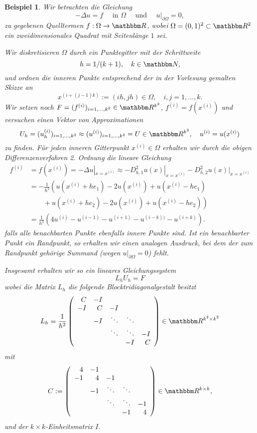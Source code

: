 \documentclass[12pt,a4paper]{book}
\theoremstyle{break}
\newtheorem{beispiel}[theorem]{Beispiel}
\theoremstyle{nonumberplain}
\newcommand{\N}{\mathbbm N}
\newcommand{\R}{\mathbbm R}
\newcommand{\1}{\mathbbm{1}} 			      	%
\begin{document}
\begin{beispiel}\label{bsp:poisson}
Wir betrachten die Gleichung
\[
-\Delta u=f \quad \mbox{ in $\Omega$} \quad \mbox{ und } \quad u|_{\partial \Omega}=0,
\]
zu gegebenen Quelltermen $f:\Omega \to \R$, wobei $\Omega=(0,1)^2\subset \R^2$ ein zweidimensionales Quadrat mit Seitenlänge $1$ sei.

Wir diskretisieren $\Omega$ durch ein Punktegitter mit der Schrittweite 
 \[
h=1/(k+1),\quad k\in \N,
\]
und ordnen 
die inneren Punkte entsprechend der in der Vorlesung gemalten Skizze an
\[
x^{(i+(j-1)k)}:=(ih,jh)\in \Omega, \quad i,j=1,\ldots,k.
\]
Wir setzen noch $F=(f^{(i)})_{i=1,\ldots,k^2}\in \R^{k^2}$, $f^{(i)}=f(x^{(i)})$ und versuchen einen
Vektor von Approximationen 
\[
U_h=(u_h^{(i)})_{i=1,\ldots,k^2}\approx (u^{(i)})_{i=1,\ldots,k^2}=U \in \R^{k^2}, \quad u^{(i)}=u(x^{(i)})
\]
zu finden. Für jeden inneren Gitterpunkt $x^{(i)}\in \Omega$ erhalten wir durch die obigen Differenzenverfahren 2. Ordnung
die lineare Gleichung
\begin{align*}
f^{(i)}&=f(x^{(i)})=- \Delta u|_{x=x^{(i)}}\approx - D_{h,1}^2 u(x)|_{x=x^{(i)}} - D_{h,2}^2 u(x)|_{x=x^{(i)}}\\
&= -\frac{1}{h^2}\left( u(x^{(i)} + he_1)-2u(x^{(i)})+u(x^{(i)}-he_1) \right.\\
& \qquad \left. {} + u(x^{(i)} + he_2)-2u(x^{(i)})+u(x^{(i)}-he_2)\right)\\
&= \frac{1}{h^2} \left( 4 u^{(i)} - u^{(i-1)} - u^{(i+1)} -  u^{(i-k))} - u^{(i+k)} \right).
\end{align*}
falls alle benachbarten Punkte ebenfalls innere Punkte sind. Ist ein benachbarter Punkt ein Randpunkt, so erhalten
wir einen analogen Ausdruck, bei dem der zum Randpunkt gehörige Summand (wegen $u|_{\partial \Omega}=0$) fehlt.

Insgesamt erhalten wir so ein lineares Gleichungssystem
\[
L_h U_h = F
\]
wobei die Matrix $L_h$ die folgende Blocktridiagonalgestalt besitzt
\[
L_h=\frac{1}{h^2}\left( \begin{array}{r r r r r} C & -I\\ -I & C & -I\\ & -I & \ddots & \ddots\\ & & \ddots & \ddots & -I\\ & & & -I & C\end{array}\right)\in \R^{k^2\times k^2}
\]
mit
\[
C:=\left( \begin{array}{r r r r r} 4 & -1\\ -1 & 4 & -1\\ & -1 & \ddots & \ddots\\ & & \ddots & \ddots & -1\\ & & & -1 & 4\end{array}\right)\in \R^{k\times k},
\]
und der $k\times k$-Einheitsmatrix $I$.
\end{beispiel}
\end{document}

